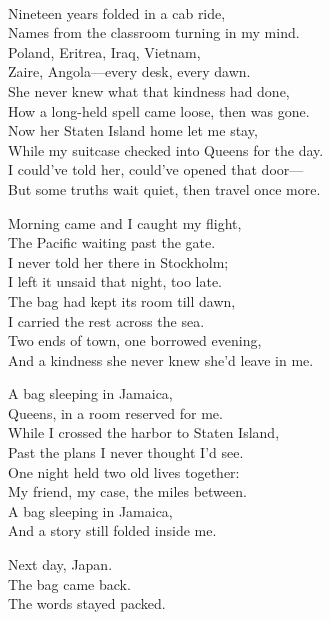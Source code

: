 \begin{lyrics}
\\
Nineteen years folded in a cab ride,\\
Names from the classroom turning in my mind.\\
Poland, Eritrea, Iraq, Vietnam,\\
Zaire, Angola—every desk, every dawn.\\
She never knew what that kindness had done,\\
How a long-held spell came loose, then was gone.\\
Now her Staten Island home let me stay,\\
While my suitcase checked into Queens for the day.\\
I could've told her, could've opened that door—\\
But some truths wait quiet, then travel once more.

Morning came and I caught my flight,\\
The Pacific waiting past the gate.\\
I never told her there in Stockholm;\\
I left it unsaid that night, too late.\\
The bag had kept its room till dawn,\\
I carried the rest across the sea.\\
Two ends of town, one borrowed evening,\\
And a kindness she never knew she'd leave in me.

A bag sleeping in Jamaica,\\
Queens, in a room reserved for me.\\
While I crossed the harbor to Staten Island,\\
Past the plans I never thought I'd see.\\
One night held two old lives together:\\
My friend, my case, the miles between.\\
A bag sleeping in Jamaica,\\
And a story still folded inside me.

Next day, Japan.\\
The bag came back.\\
The words stayed packed.
\end{lyrics}

